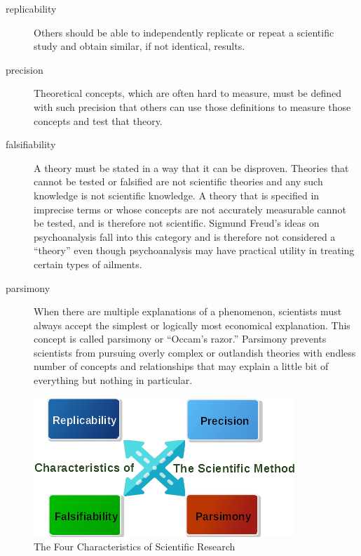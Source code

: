 \begin{description}
	\item[\Gls{replicability}] Others should be able to independently replicate or repeat a scientific study and obtain similar, if not identical, results.

	\item[\Gls{precision}] Theoretical concepts, which are often hard to measure, must be defined with such precision that others can use those definitions to measure those concepts and test that theory.

	\item[\Gls{falsifiability}] A theory must be stated in a way that it can be disproven. Theories that cannot be tested or falsified are not scientific theories and any such knowledge is not scientific knowledge. A theory that is specified in imprecise terms or whose concepts are not accurately measurable cannot be tested, and is therefore not scientific. Sigmund Freud's ideas on psychoanalysis fall into this category and is therefore not considered a ``theory'' even though psychoanalysis may have practical utility in treating certain types of ailments.

	\item[\Gls{parsimony}] When there are multiple explanations of a phenomenon, scientists must always accept the simplest or logically most economical explanation. This concept is called parsimony or ``Occam's razor.'' Parsimony prevents scientists from pursuing overly complex or outlandish theories with endless number of concepts and relationships that may explain a little bit of everything but nothing in particular.
\end{description}

\begin{figure}[H]
	\centering
	\includegraphics[width=\maxwidth{.95\linewidth}]{gfx/01-SciMethodChar}
	\caption{The Four Characteristics of Scientific Research}
	\label{01:fig05}
\end{figure}

